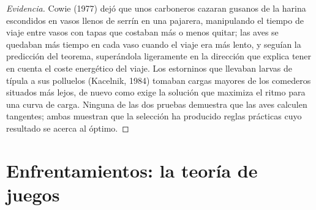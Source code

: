 \begin{proof}[Evidencia]
Cowie (1977) dejó que unos carboneros cazaran gusanos de la harina
escondidos en vasos llenos de serrín en una pajarera, manipulando el
tiempo de viaje entre vasos con tapas que costaban más o menos quitar;
las aves se quedaban más tiempo en cada vaso cuando el viaje era más
lento, y seguían la predicción del teorema, superándola ligeramente en
la dirección que explica tener en cuenta el coste energético del viaje.
Los estorninos que llevaban larvas de típula a sus polluelos
(Kacelnik, 1984) tomaban cargas mayores de los comederos situados más
lejos, de nuevo como exige la solución que maximiza el ritmo para una
curva de carga. Ninguna de las dos pruebas demuestra que las aves
calculen tangentes; ambas muestran que la selección ha producido reglas
prácticas cuyo resultado se acerca al óptimo.
\end{proof}

\section{Enfrentamientos: la teoría de juegos}

